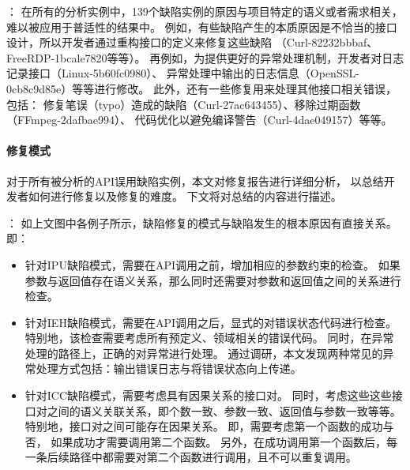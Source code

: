 
\vspace*{10pt}
\begin{center}
	\noindent{}
\end{center}

：
在所有的分析实例中，139个缺陷实例的原因与项目特定的语义或者需求相关，
难以被应用于普适性的结果中。
例如，有些缺陷产生的本质原因是不恰当的接口设计，所以开发者通过重构接口的定义来修复这些缺陷
（Curl-82232bbbaf、FreeRDP-1bcale7820等等）。
再例如，为提供更好的异常处理机制，开发者对日志记录接口（Linux-5b60fc0980）、
异常处理中输出的日志信息（OpenSSL-0cb8c9d85e）等等进行修改。
此外，还有一些修复用来处理其他接口相关错误，包括：
修复笔误（typo）造成的缺陷（Curl-27ac643455）、移除过期函数（FFmpeg-2dafbae994）、
代码优化以避免编译警告（Curl-4dae049157）等等。

\paragraph{修复模式}
对于所有被分析的API误用缺陷实例，本文对修复报告进行详细分析，
以总结开发者如何进行修复以及修复的难度。
下文将对总结的内容进行描述。

{}：
如上文图中各例子所示，缺陷修复的模式与缺陷发生的根本原因有直接关系。即：
\begin{itemize}
	\item 针对IPU缺陷模式，需要在API调用之前，增加相应的参数约束的检查。
	如果参数与返回值存在语义关系，那么同时还需要对参数和返回值之间的关系进行检查。
	\item 针对IEH缺陷模式，需要在API调用之后，显式的对错误状态代码进行检查。
	特别地，该检查需要考虑所有预定义、领域相关的错误代码。
	同时，在异常处理的路径上，正确的对异常进行处理。
	通过调研，本文发现两种常见的异常处理方式包括：输出错误日志与将错误状态向上传递。
	\item 针对ICC缺陷模式，需要考虑具有因果关系的接口对。
	同时，考虑这些这些接口对之间的语义关联关系，即个数一致、参数一致、返回值与参数一致等等。
	特别地，接口对之间可能存在因果关系。
	即，需要考虑第一个函数的成功与否，
	如果成功才需要调用第二个函数。
	另外，在成功调用第一个函数后，每一条后续路径中都需要对第二个函数进行调用，且不可以重复调用。
\end{itemize}

